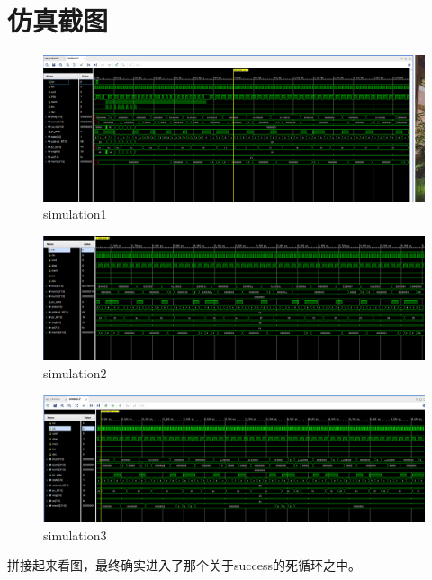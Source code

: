 \documentclass[12pt, a4paper]{article}
\begin{document}
\section{仿真截图}
\begin{figure}[H]
	\centering
	\includegraphics[width=1\linewidth]{pics/sim1}
	\caption{simulation1}
	\label{fig:sim1}
\end{figure}
\begin{figure}[H]
\centering
\includegraphics[width=1\linewidth]{pics/sim2}
\caption{simulation2}
\label{fig:sim2}
\end{figure}
\begin{figure}[H]
\centering
\includegraphics[width=1\linewidth]{pics/sim3}
\caption{simulation3}
\label{fig:sim3}
\end{figure}
拼接起来看图，最终确实进入了那个关于success的死循环之中。
\end{document}
